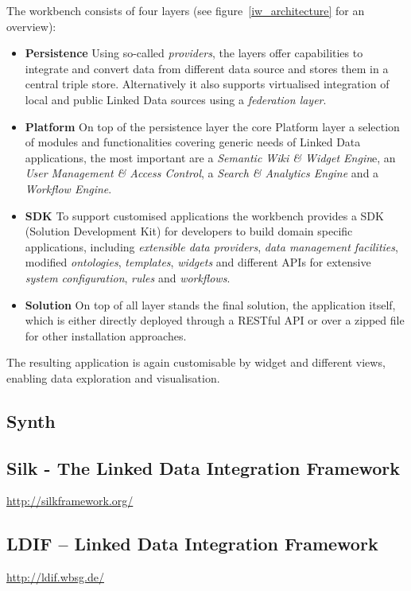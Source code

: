 The workbench consists of four layers (see figure~\ref{iw_architecture} for an overview):~\cite{haase2011information}~\cite{gossenainformation}

\begin{itemize}
\item \textbf{Persistence}
Using so-called \emph{providers}, the layers offer capabilities to integrate and convert data from different data source and stores them in a central triple store. Alternatively it also supports virtualised integration of local and public Linked Data sources using a \emph{federation layer}.
\item \textbf{Platform}
On top of the persistence layer the core Platform layer a selection of modules and functionalities covering generic needs of Linked Data applications, the most important are a \emph{Semantic Wiki \& Widget Engin}e, an \emph{User Management \& Access Control}, a \emph{Search \& Analytics Engine} and a \emph{Workflow Engine}.
\item \textbf{SDK} To support customised applications the workbench provides a SDK (Solution Development Kit) for developers to build domain specific applications, including \emph{extensible data providers}, \emph{data management facilities}, modified \emph{ontologies}, \emph{templates}, \emph{widgets} and different APIs for extensive \emph{system configuration}, \emph{rules} and \emph{workflows}.
\item \textbf{Solution}
On top of all layer stands the final solution, the application itself, which is either directly deployed through a RESTful API or over a zipped file for other installation approaches.
\end{itemize}

The resulting application is again customisable by widget and different views, enabling data exploration and visualisation.

\subsection{Synth}

\subsection{Silk - The Linked Data Integration Framework}\label{silk}
\url{http://silkframework.org/}
\cite{volz2009silk}
\cite{jentzsch2010silk}
\cite{isele2010silk}

\subsection{LDIF – Linked Data Integration Framework}
\url{http://ldif.wbsg.de/}
\cite{schultz2011ldif}
\cite{schultz2012ldif}

